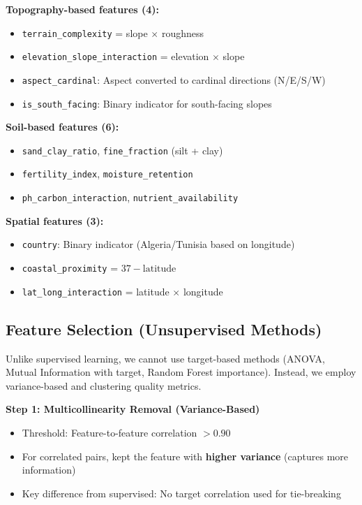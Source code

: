 \textbf{Topography-based features (4):}
\begin{itemize}
    \item \texttt{terrain\_complexity} = slope $\times$ roughness
    \item \texttt{elevation\_slope\_interaction} = elevation $\times$ slope
    \item \texttt{aspect\_cardinal}: Aspect converted to cardinal directions (N/E/S/W)
    \item \texttt{is\_south\_facing}: Binary indicator for south-facing slopes
\end{itemize}

\textbf{Soil-based features (6):}
\begin{itemize}
    \item \texttt{sand\_clay\_ratio}, \texttt{fine\_fraction} (silt + clay)
    \item \texttt{fertility\_index}, \texttt{moisture\_retention}
    \item \texttt{ph\_carbon\_interaction}, \texttt{nutrient\_availability}
\end{itemize}

\textbf{Spatial features (3):}
\begin{itemize}
    \item \texttt{country}: Binary indicator (Algeria/Tunisia based on longitude)
    \item \texttt{coastal\_proximity} = $37 - \text{latitude}$
    \item \texttt{lat\_long\_interaction} = latitude $\times$ longitude
\end{itemize}

\subsection{Feature Selection (Unsupervised Methods)}

Unlike supervised learning, we cannot use target-based methods (ANOVA, Mutual Information with target, Random Forest importance). Instead, we employ variance-based and clustering quality metrics.

\textbf{Step 1: Multicollinearity Removal (Variance-Based)}
\begin{itemize}
    \item Threshold: Feature-to-feature correlation $> 0.90$
    \item For correlated pairs, kept the feature with \textbf{higher variance} (captures more information)
    \item Key difference from supervised: No target correlation used for tie-breaking
\end{itemize}

